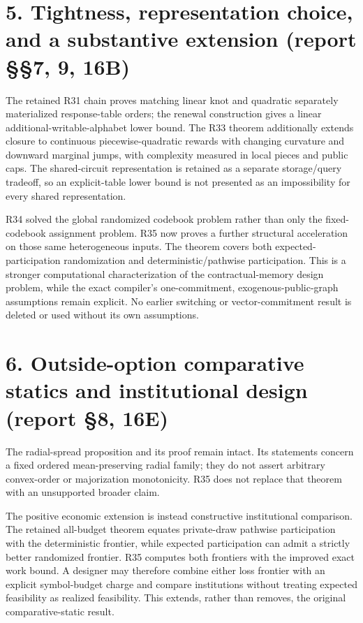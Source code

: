 \documentclass[11pt,letterpaper]{article}
\begin{document}
\section*{5. Tightness, representation choice, and a substantive extension (report §§7, 9, 16B)}

The retained R31 chain proves matching linear knot and quadratic separately materialized response-table orders; the renewal construction gives a linear additional-writable-alphabet lower bound. The R33 theorem additionally extends closure to continuous piecewise-quadratic rewards with changing curvature and downward marginal jumps, with complexity measured in local pieces and public caps. The shared-circuit representation is retained as a separate storage/query tradeoff, so an explicit-table lower bound is not presented as an impossibility for every shared representation.


R34 solved the global randomized codebook problem rather than only the fixed-codebook assignment problem. R35 now proves a further structural acceleration on those same heterogeneous inputs. The theorem covers both expected-participation randomization and deterministic/pathwise participation. This is a stronger computational characterization of the contractual-memory design problem, while the exact compiler's one-commitment, exogenous-public-graph assumptions remain explicit. No earlier switching or vector-commitment result is deleted or used without its own assumptions.


\section*{6. Outside-option comparative statics and institutional design (report §8, 16E)}

The radial-spread proposition and its proof remain intact. Its statements concern a fixed ordered mean-preserving radial family; they do not assert arbitrary convex-order or majorization monotonicity. R35 does not replace that theorem with an unsupported broader claim.


The positive economic extension is instead constructive institutional comparison. The retained all-budget theorem equates private-draw pathwise participation with the deterministic frontier, while expected participation can admit a strictly better randomized frontier. R35 computes both frontiers with the improved exact work bound. A designer may therefore combine either loss frontier with an explicit symbol-budget charge and compare institutions without treating expected feasibility as realized feasibility. This extends, rather than removes, the original comparative-static result.
\end{document}
